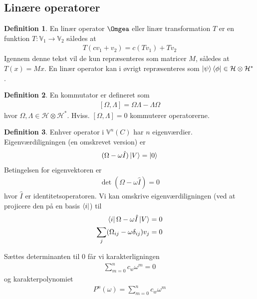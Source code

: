 \documentclass[12pt]{article}
\theoremstyle{definition}
\theoremstyle{remark}
\theoremstyle{definition}
\newtheorem{definition}{Definition}[section]
\renewcommand{\H}{\mathcal H}
\newcounter{theo}[section]\setcounter{theo}{0}
\numberwithin{equation}{section}
\begin{document}
\subsection{Linære operatorer}
\begin{definition}
En linær operator $\Omgea$ eller linær transformation $T$ er en
funktion $T:\mathbb V_1 \to \mathbb V_2$ således at
\begin{align}
  \label{eq:2}
  T(cv_1+v_2) = c(Tv_1) + Tv_2
\end{align}
Igennem denne tekst vil de kun repræsenteres som matricer $M$, således
at $T(x)=Mx$. En linær operator kan i øvrigt repræsenteres som $\ket
\psi \bra \phi \in \mathcal H \otimes \mathcal H^*$.

\end{definition}

\begin{definition}
  En kommutator er defineret som
  \begin{align}
    \label{eq:com}
    [\Omega, \Lambda] = \Omega\Lambda - \Lambda \Omega
  \end{align}
  hvor $\Omega,\Lambda \in \H\otimes \H^*$. Hviss. $[\Omega, \Lambda]
= 0$ kommuterer operatorerne.

\end{definition}

\begin{definition}
Enhver operator i $\mathbb V^n(C)$ har $n$
eigenværdier. Eigenværdiligningen (en omskrevet version) er
\begin{align}
  \label{eq:eigen}
  (\Omega - \omega \hat I)\ket V = \ket 0
\end{align}
Betingelsen for eigenvektoren er
\begin{align}
  \label{eq:kre}
  \det(\Omega-\omega \hat I) = 0
\end{align}
hvor $\hat I$ er identitetsoperatoren. Vi kan omskrive
eigenværdiligningen (ved at projicere den på en basis $\bra i$) til
\begin{align}
  \label{eq:eig2}
  \begin{split}
   \bra i \Omega - \omega\hat I \ket V = 0 \\
   \sum_j (\Omega_{ij}-\omega \delta_{ij})v_j = 0 
  \end{split}
\end{align}

Sættes determinanten til 0 får vi karakterligningen 
\begin{align}
  \label{eq:karklig}
  \sum_{m=0}^n c_w \omega^m = 0
\end{align}
og karakterpolynomiet
\begin{align}
  \label{eq:ei}
  P^n(\omega) = \sum_{m=0}^n c_w \omega^m
\end{align}
\end{definition}
\end{document}
